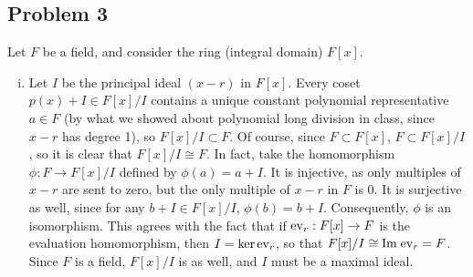 \documentclass{../../mathnotes}
\begin{document}
\subsection*{Problem 3}

Let $F$ be a field, and consider the ring (integral domain) $F[x]$.

\begin{enumerate}[(i)]
    \item Let $I$ be the principal ideal $(x-r)$ in $F[x]$. Every coset $p(x)+I\in F[x]/I$ contains a unique constant polynomial representative $a\in F$
        (by what we showed about polynomial long division in class, since $x-r$ has degree 1), so $F[x]/I\subset F$. Of course, since $F\subset F[x]$,
        $F\subset F[x]/I$, so it is clear
        that $F[x]/I\cong F$. In fact, take the homomorphism $\phi:F\to F[x]/I$ defined by $\phi(a)=a+I$. It is injective, as only multiples of
        $x-r$ are sent to zero, but the only multiple of $x-r$ in $F$ is 0. It is surjective as well, since for any $b+I\in F[x]/I$, $\phi(b)=b+I$. 
        Consequently, $\phi$ is an isomorphism. This agrees with the fact that if ${\rm ev}_r:F[x]\to F$ is the evaluation homomorphism, then
        $I=\ker {\rm ev}_{r}$, so that $F[x]/I\cong {\rm Im}\; {\rm ev}_r=F$. Since $F$ is a field, $F[x]/I$ is as well, and $I$ must be a maximal ideal.


\end{enumerate}
\end{document}
